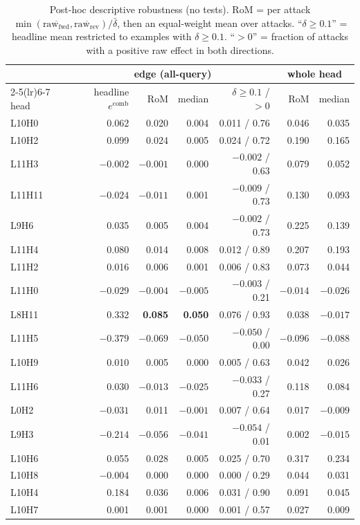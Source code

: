 \documentclass[11pt]{article}
\newcommand{\comb}{\ensuremath{e^{\mathrm{comb}}}}
\begin{document}
\begin{table}[H]\centering\small
\caption{Post-hoc descriptive robustness (no tests). RoM = per attack
$\min(\overline{\text{raw}_{\text{fwd}}},\overline{\text{raw}_{\text{rev}}})/\bar\delta$,
then an equal-weight mean over attacks. ``$\delta\!\ge\!0.1$'' = headline
mean restricted to examples with $\delta\ge0.1$. ``$>0$'' = fraction of
attacks with a positive raw effect in both directions.}
\label{tab:robust}
\begin{tabular}{lrrrrrr}
\toprule
& \multicolumn{4}{c}{edge (all-query)} & \multicolumn{2}{c}{whole head}\\
\cmidrule(lr){2-5}\cmidrule(lr){6-7}
head & headline \comb & RoM & median & $\delta\!\ge\!0.1$ / $>0$ & RoM & median\\
\midrule
L10H0 & 0.062 & 0.020 & 0.004 & 0.011 / 0.76 & 0.046 & 0.035\\
L10H2 & 0.099 & 0.024 & 0.005 & 0.024 / 0.72 & 0.190 & 0.165\\
L11H3 & $-0.002$ & $-0.001$ & 0.000 & $-0.002$ / 0.63 & 0.079 & 0.052\\
L11H11 & $-0.024$ & $-0.011$ & 0.001 & $-0.009$ / 0.73 & 0.130 & 0.093\\
L9H6 & 0.035 & 0.005 & 0.004 & $-0.002$ / 0.73 & 0.225 & 0.139\\
L11H4 & 0.080 & 0.014 & 0.008 & 0.012 / 0.89 & 0.207 & 0.193\\
L11H2 & 0.016 & 0.006 & 0.001 & 0.006 / 0.83 & 0.073 & 0.044\\
L11H0 & $-0.029$ & $-0.004$ & $-0.005$ & $-0.003$ / 0.21 & $-0.014$ & $-0.026$\\
L8H11 & 0.332 & \textbf{0.085} & \textbf{0.050} & 0.076 / 0.93 & 0.038 & $-0.017$\\
L11H5 & $-0.379$ & $-0.069$ & $-0.050$ & $-0.050$ / 0.00 & $-0.096$ & $-0.088$\\
L10H9 & 0.010 & 0.005 & 0.000 & 0.005 / 0.63 & 0.042 & 0.026\\
L11H6 & 0.030 & $-0.013$ & $-0.025$ & $-0.033$ / 0.27 & 0.118 & 0.084\\
L0H2 & $-0.031$ & 0.011 & $-0.001$ & 0.007 / 0.64 & 0.017 & $-0.009$\\
L9H3 & $-0.214$ & $-0.056$ & $-0.041$ & $-0.054$ / 0.01 & 0.002 & $-0.015$\\
L10H6 & 0.055 & 0.028 & 0.005 & 0.025 / 0.70 & 0.317 & 0.234\\
L10H8 & $-0.004$ & 0.000 & 0.000 & 0.000 / 0.29 & 0.044 & 0.031\\
L10H4 & 0.184 & 0.036 & 0.006 & 0.031 / 0.90 & 0.091 & 0.045\\
L10H7 & 0.001 & 0.001 & 0.000 & 0.001 / 0.57 & 0.027 & 0.009\\
\bottomrule
\end{tabular}
\end{table}
\end{document}
